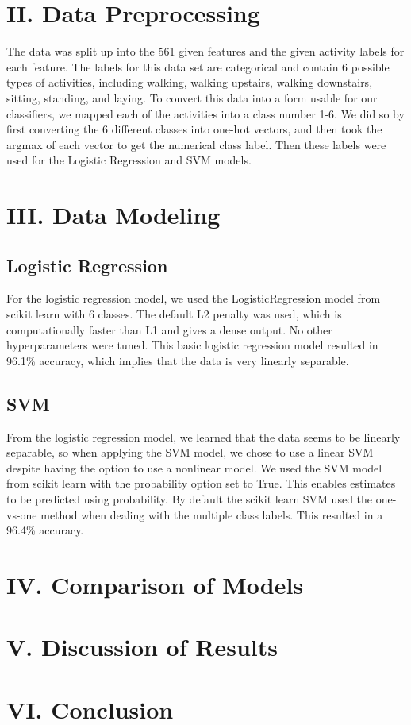 \documentclass[12pt]{article}
\begin{document}
\section*{II. Data Preprocessing}
 	The data was split up into the 561 given features and the given activity labels for each feature. The labels for this data set are categorical and contain 6 possible types of activities, including walking, walking upstairs, walking downstairs, sitting, standing, and laying. 
   \newline \newline To convert this data into a form usable for our classifiers, we mapped each of the activities into a class number 1-6. We did so by first converting the 6 different classes into one-hot vectors, and then took the argmax of each vector to get the numerical class label. Then these labels were used for the Logistic Regression and SVM models.
   
\section*{III. Data Modeling}
\subsection*{Logistic Regression}
For the logistic regression model, we used the LogisticRegression model from scikit learn with 6 classes. The default L2 penalty was used, which is computationally faster than L1 and gives a dense output. No other hyperparameters were tuned. This basic logistic regression model resulted in 96.1\% accuracy, which implies that the data is very linearly separable.

\subsection*{SVM}
From the logistic regression model, we learned that the data seems to be linearly separable, so when applying the SVM model, we chose to use a linear SVM despite having the option to use a nonlinear model. We used the SVM model from scikit learn with the probability option set to True. This enables estimates to be predicted using probability. By default the scikit learn SVM used the one-vs-one method when dealing with the multiple class labels. This resulted in a 96.4\% accuracy.
\section*{IV. Comparison of Models}
\section*{V. Discussion of Results}
\section*{VI. Conclusion}
\end{document}
